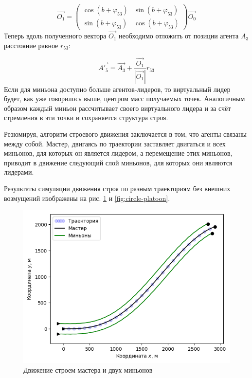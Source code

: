 \documentclass[a4paper, 14pt]{extarticle}
\begin{document}
$$\vec{O_{1}} =  \left(\begin{array}{cc} \cos{(b + \varphi_{53})} & \sin{(b + \varphi_{53})}\\ \sin{(b + \varphi_{53})} & \cos{(b + \varphi_{53})} \end{array}\right) \vec{O_{0}} $$
Теперь вдоль полученного вектора $\vec{O_1}$ необходимо отложить от позиции агента $A_3$ расстояние равное $r_{53}$:\par
$$ \vec{A'_{5}} = \vec{A_3} + \frac{\vec{O_1}}{|\vec{O_1}|} r_{53}$$ 
Если для миньона доступно больше агентов-лидеров, то виртуальный лидер будет, как уже говорилось выше, центром масс получаемых точек. Аналогичным образом каждый миньон рассчитывает своего виртуального лидера и за счёт стремления в эти точки и сохраняется структура строя.\par
Резюмируя, алгоритм строевого движения заключается в том, что агенты связаны между собой. Мастер, двигаясь по траектории заставляет двигаться и всех миньонов, для которых он является лидером, а перемещение этих миньонов, приводит в движение следующий слой миньонов, для которых они являются лидерами. \par
Результаты симуляции движения строя по разным траекториям без внешних возмущений изображены на рис. \ref{fig:platoon-trajectory-0} и \ref{fig:circle-platoon}. \par
\begin{figure}[!htbp]
	\centering
	\includegraphics[width=0.7\linewidth]{platoon-trajectory-0}
	\caption{Движение строем мастера и двух миньонов}
	\label{fig:platoon-trajectory-0}
\end{figure}
\end{document}
